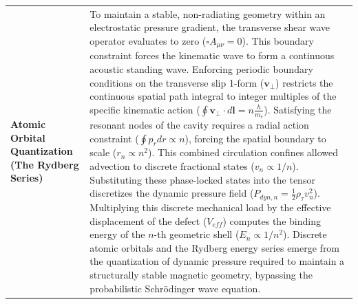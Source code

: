 \begin{longtable}{p{} p{}}
    \textbf{Atomic Orbital Quantization (The Rydberg Series)} & To maintain a stable, non-radiating geometry within an electrostatic pressure gradient, the transverse shear wave operator evaluates to zero ($\square A_{\mu\nu} = 0$). This boundary constraint forces the kinematic wave to form a continuous acoustic standing wave. Enforcing periodic boundary conditions on the transverse slip 1-form ($\mathbf{v}_\perp$) restricts the continuous spatial path integral to integer multiples of the specific kinematic action ($\oint \mathbf{v}_\perp \cdot d\mathbf{l} = n \frac{h}{m_e}$). Satisfying the resonant nodes of the cavity requires a radial action constraint ($\oint p_r dr \propto n$), forcing the spatial boundary to scale ($r_n \propto n^2$). This combined circulation confines allowed advection to discrete fractional states ($v_n \propto 1/n$). Substituting these phase-locked states into the tensor discretizes the dynamic pressure field ($P_{dyn, n} = \frac{1}{2}\rho_\tau v_n^2$). Multiplying this discrete mechanical load by the effective displacement of the defect ($V_{eff}$) computes the binding energy of the $n$-th geometric shell ($E_n \propto 1/n^2$). Discrete atomic orbitals and the Rydberg energy series emerge from the quantization of dynamic pressure required to maintain a structurally stable magnetic geometry, bypassing the probabilistic Schrödinger wave equation. \\
\end{longtable}

\vspace{0.4cm}

\newpage


